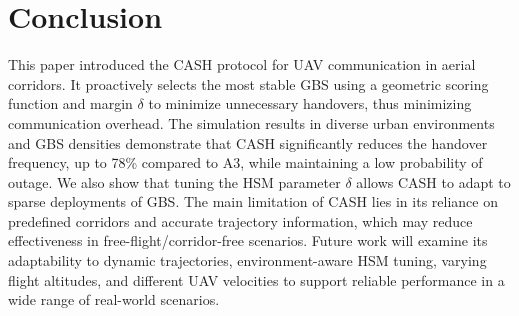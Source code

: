 \documentclass[10pt,conference]{IEEEtran}
\begin{document}
\section{Conclusion}

This paper introduced the CASH protocol for UAV communication in aerial corridors. It proactively selects the most stable GBS using a geometric scoring function and margin $\delta$ to minimize unnecessary handovers, thus minimizing communication overhead. The simulation results in diverse urban environments and GBS densities demonstrate that CASH significantly reduces the handover frequency, up to 78\% compared to A3, while maintaining a low probability of outage. We also show that tuning the HSM parameter $\delta$ allows CASH to adapt to sparse deployments of GBS. The main limitation of CASH lies in its reliance on predefined corridors and accurate trajectory information, which may reduce effectiveness in free-flight/corridor-free scenarios. Future work will examine its adaptability to dynamic trajectories, environment-aware HSM tuning, varying flight altitudes, and different UAV velocities to support reliable performance in a wide range of real-world scenarios.






\balance


\end{document}
